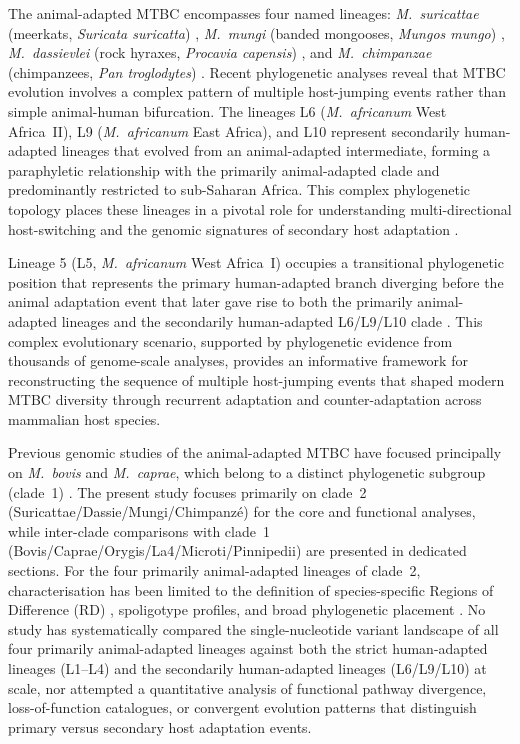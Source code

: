\documentclass[11pt,a4paper]{article}
\newcommand{\Msur}{\textit{M.~suricattae}}
\newcommand{\Mmun}{\textit{M.~mungi}}
\newcommand{\Mdas}{\textit{M.~dassievlei}}
\newcommand{\Mchi}{\textit{M.~chimpanzae}}
\begin{document}
The animal-adapted MTBC encompasses four named lineages: \Msur{}
(meerkats, \textit{Suricata suricatta}) \cite{Alexander2010},
\Mmun{} (banded mongooses, \textit{Mungos mungo}) \cite{Roos2012},
\Mdas{} (rock hyraxes, \textit{Procavia capensis}) \cite{Parsons2008}, and
\Mchi{} (chimpanzees, \textit{Pan troglodytes}) \cite{Fabre2010}.
%
Recent phylogenetic analyses reveal that MTBC evolution involves a complex
pattern of multiple host-jumping events rather than simple animal-human
bifurcation. The lineages L6 (\textit{M.~africanum} West Africa~II),
L9 (\textit{M.~africanum} East Africa), and L10 \cite{Coscolla2021, Guyeux2024L10}
represent secondarily human-adapted lineages that evolved from an
animal-adapted intermediate, forming a paraphyletic relationship with
the primarily animal-adapted clade and predominantly restricted to
sub-Saharan Africa.
%
This complex phylogenetic topology places these lineages in a pivotal role
for understanding multi-directional host-switching and the genomic signatures
of secondary host adaptation \cite{Comas2013, Boritsch2016}.

Lineage 5 (L5, \textit{M.~africanum} West Africa~I) occupies a transitional
phylogenetic position that represents the primary human-adapted branch
diverging before the animal adaptation event that later gave rise to both
the primarily animal-adapted lineages and the secondarily human-adapted
L6/L9/L10 clade \cite{deJong2010, Coll2014}.
%
This complex evolutionary scenario, supported by phylogenetic evidence from
thousands of genome-scale analyses, provides an informative framework for
reconstructing the sequence of multiple host-jumping events that shaped
modern MTBC diversity through recurrent adaptation and counter-adaptation
across mammalian host species.

Previous genomic studies of the animal-adapted MTBC have focused principally on
\textit{M.~bovis} and \textit{M.~caprae}, which belong to a distinct
phylogenetic subgroup (clade~1) \cite{Brosch2002}.
%
The present study focuses primarily on clade~2
(Suricattae/Dassie/Mungi/Chimpanzé) for the core and functional analyses,
while inter-clade comparisons with clade~1
(Bovis/Caprae/Orygis/La4/Microti/Pinnipedii) are presented in dedicated
sections.
%
For the four primarily animal-adapted lineages of clade~2,
characterisation has been limited to the definition of species-specific
Regions of Difference (RD) \cite{Parsons2008, Roos2012, Fabre2010},
spoligotype profiles, and broad phylogenetic placement \cite{Coll2014, Boritsch2016, Brites2018}.
%
No study has systematically compared the single-nucleotide variant landscape of
all four primarily animal-adapted lineages against both the strict human-adapted
lineages (L1--L4) and the secondarily human-adapted lineages (L6/L9/L10) at
scale, nor attempted a quantitative analysis of functional pathway divergence,
loss-of-function catalogues, or convergent evolution patterns that distinguish
primary versus secondary host adaptation events.
\end{document}
